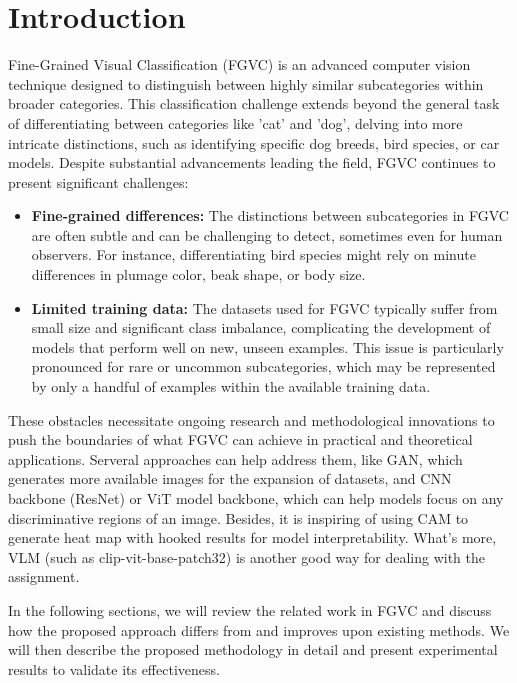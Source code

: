 \section{Introduction}
\label{sec:intro}

Fine-Grained Visual Classification (FGVC) is an advanced computer vision technique designed to distinguish between highly similar subcategories within broader categories. This classification challenge extends beyond the general task of differentiating between categories like 'cat' and 'dog', delving into more intricate distinctions, such as identifying specific dog breeds, bird species, or car models. Despite substantial advancements leading the field, FGVC continues to present significant challenges:

\begin{itemize}
    \item \textbf{Fine-grained differences:} The distinctions between subcategories in FGVC are often subtle and can be challenging to detect, sometimes even for human observers. For instance, differentiating bird species might rely on minute differences in plumage color, beak shape, or body size.
    \item \textbf{Limited training data:} The datasets used for FGVC typically suffer from small size and significant class imbalance, complicating the development of models that perform well on new, unseen examples. This issue is particularly pronounced for rare or uncommon subcategories, which may be represented by only a handful of examples within the available training data.
\end{itemize}

These obstacles necessitate ongoing research and methodological innovations to push the boundaries of what FGVC can achieve in practical and theoretical applications. Serveral approaches can help address them, like GAN, which generates more available images for the expansion of datasets, and CNN backbone 
(ResNet) or ViT model backbone, which can help models focus on any discriminative regions of an image. Besides, it is inspiring of using CAM to generate heat map with hooked results for model interpretability. What's more, VLM (such as clip-vit-base-patch32) is another good way for dealing with the assignment.

In the following sections, we will review the related work in FGVC and discuss how the proposed approach differs from and improves upon existing methods. We will then describe the proposed methodology in detail and present experimental results to validate its effectiveness.

